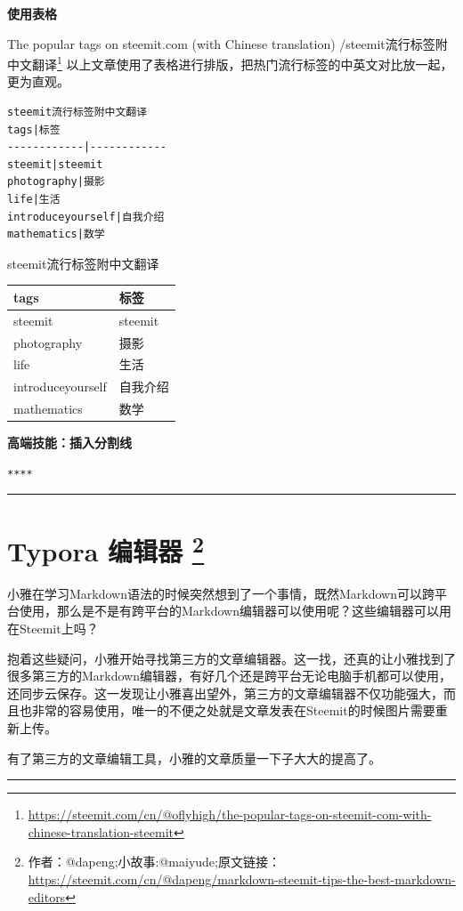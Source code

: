 \documentclass[]{ctexbook}
\renewcommand{\href}[2]{#2\footnote{\url{#1}}}
\begin{document}
\textbf{使用表格}

\href{https://steemit.com/cn/@oflyhigh/the-popular-tags-on-steemit-com-with-chinese-translation-steemit}{The popular tags on steemit.com (with Chinese translation) /steemit流行标签附中文翻译}
以上文章使用了表格进行排版，把热门流行标签的中英文对比放一起，更为直观。

\begin{verbatim}
steemit流行标签附中文翻译
tags|标签
------------|------------
steemit|steemit
photography|摄影
life|生活
introduceyourself|自我介绍
mathematics|数学
\end{verbatim}

steemit流行标签附中文翻译

\begin{longtable}[]{@{}ll@{}}
\toprule
tags & 标签\tabularnewline
\midrule
\endhead
steemit & steemit\tabularnewline
photography & 摄影\tabularnewline
life & 生活\tabularnewline
introduceyourself & 自我介绍\tabularnewline
mathematics & 数学\tabularnewline
\bottomrule
\end{longtable}

\textbf{高端技能：插入分割线}

\texttt{****}

\begin{center}\rule{0.5\linewidth}{\linethickness}\end{center}

\hypertarget{typora-}{%
\section[Typora 编辑器 ]{\texorpdfstring{Typora 编辑器 \footnote{作者：@dapeng;小故事:@maiyude;原文链接：\url{https://steemit.com/cn/@dapeng/markdown-steemit-tips-the-best-markdown-editors}}}{Typora 编辑器 }}\label{typora-}}

小雅在学习Markdown语法的时候突然想到了一个事情，既然Markdown可以跨平台使用，那么是不是有跨平台的Markdown编辑器可以使用呢？这些编辑器可以用在Steemit上吗？

抱着这些疑问，小雅开始寻找第三方的文章编辑器。这一找，还真的让小雅找到了很多第三方的Markdown编辑器，有好几个还是跨平台无论电脑手机都可以使用，还同步云保存。这一发现让小雅喜出望外，第三方的文章编辑器不仅功能强大，而且也非常的容易使用，唯一的不便之处就是文章发表在Steemit的时候图片需要重新上传。

有了第三方的文章编辑工具，小雅的文章质量一下子大大的提高了。

\begin{center}\rule{0.5\linewidth}{\linethickness}\end{center}
\end{document}
